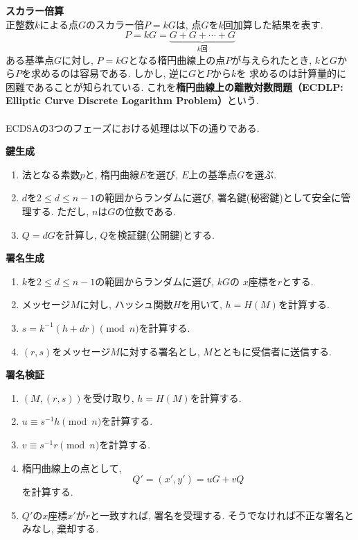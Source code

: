 \vspace{0.5em}
\noindent\textbf{スカラー倍算}\\
\indent 正整数$k$による点$G$のスカラー倍$P=kG$は, 点$G$を$k$回加算した結果を表す.
\[
  P=kG=\underbrace{G+G+\cdots+G}_{k\text{回}}
\]
\indent ある基準点$G$に対し, $P = kG$となる楕円曲線上の点$P$が与えられたとき, 
$k$と$G$から$P$を求めるのは容易である. しかし, 逆に$G$と$P$から$k$を
求めるのは計算量的に困難であることが知られている. 
これを\textbf{楕円曲線上の離散対数問題（ECDLP: Elliptic Curve Discrete Logarithm Problem）}という.\\[1em]

\\
\indent ECDSAの3つのフェーズにおける処理は以下の通りである.
\vspace{1em}
\let\ltxlist\list
\begin{breakitembox}[l]{\textbf{鍵生成}}
  　
  \begin{enumerate}[parsep=7pt]
    \item 法となる素数$p$と, 楕円曲線$E$を選び, $E$上の基準点$G$を選ぶ.
    \item $d$を$2\leq d\leq n-1$の範囲からランダムに選び, 
    署名鍵(秘密鍵)として安全に管理する. ただし, $n$は$G$の位数である.
    \item $Q=dG$を計算し, $Q$を検証鍵(公開鍵)とする.
  \end{enumerate}
\end{breakitembox}
\vspace{1em}
\let\ltxlist\list
\begin{breakitembox}[l]{\textbf{署名生成}}
  　
  \begin{enumerate}[parsep=7pt]
    \item $k$を$2\leq d\leq n-1$の範囲からランダムに選び, $kG$の
    $x$座標を$r$とする.
    \item メッセージ$M$に対し, ハッシュ関数$H$を用いて, $h=H(M)$を計算する.
    \item $s=k^{-1}(h+dr)\pmod n$を計算する.
    \item $(r,s)$をメッセージ$M$に対する署名とし, 
    $M$とともに受信者に送信する.
  \end{enumerate}
\end{breakitembox}
\vspace{1em}
\let\ltxlist\list
\begin{breakitembox}[l]{\textbf{署名検証}}
  　
  \begin{enumerate}[parsep=7pt]
    \item $(M,(r,s))$を受け取り, $h=H(M)$を計算する. 
    \item $u\equiv s^{-1}h\pmod n$を計算する.
    \item $v\equiv s^{-1}r\pmod n$を計算する.
    \item 楕円曲線上の点として,
    \begin{equation}
      Q'=(x',y')=uG+vQ
    \end{equation}
    を計算する.
    \item $Q'$の$x$座標$x'$が$r$と一致すれば, 署名を受理する.
    そうでなければ不正な署名とみなし, 棄却する.
  \end{enumerate}
\end{breakitembox}

